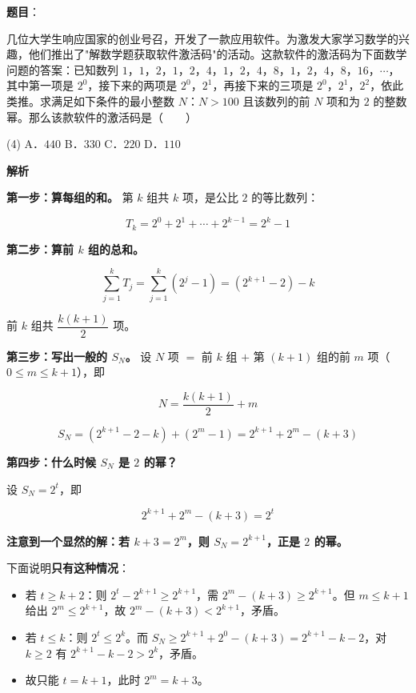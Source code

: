 \begin{answer}

\textbf{题目}：

几位大学生响应国家的创业号召，开发了一款应用软件。为激发大家学习数学的兴趣，他们推出了"解数学题获取软件激活码"的活动。这款软件的激活码为下面数学问题的答案：已知数列 $1$，$1$，$2$，$1$，$2$，$4$，$1$，$2$，$4$，$8$，$1$，$2$，$4$，$8$，$16$，$\cdots$，其中第一项是 $2^{0}$，接下来的两项是 $2^{0}$，$2^{1}$，再接下来的三项是 $2^{0}$，$2^{1}$，$2^{2}$，依此类推。求满足如下条件的最小整数 $N$：$N>100$ 且该数列的前 $N$ 项和为 $2$ 的整数幂。那么该款软件的激活码是\mbox{（　　）}

\begin{gkopts}(4)
\task A．$440$
\task B．$330$
\task C．$220$
\task D．$110$
\end{gkopts}

\textbf{解析}

\textbf{第一步：算每组的和。} 第 $k$ 组共 $k$ 项，是公比 $2$ 的等比数列：

\nopagebreak[4]
\[T_k=2^{0}+2^{1}+\cdots+2^{k-1}=2^{k}-1\]

\textbf{第二步：算前 $k$ 组的总和。}

\nopagebreak[4]
\[\sum_{j=1}^{k}T_j=\sum_{j=1}^{k}\left(2^{j}-1\right)=\left(2^{k+1}-2\right)-k\]

前 $k$ 组共 $\dfrac{k(k+1)}2$ 项。

\textbf{第三步：写出一般的 $S_N$。} 设 $N$ 项 $=$ 前 $k$ 组 $+$ 第 $(k+1)$ 组的前 $m$ 项（$0\le m\le k+1$），即

\nopagebreak[4]
\[N=\frac{k(k+1)}2+m\]

\nopagebreak[4]
\[S_N=\left(2^{k+1}-2-k\right)+\left(2^{m}-1\right)=2^{k+1}+2^{m}-(k+3)\]

\textbf{第四步：什么时候 $S_N$ 是 $2$ 的幂？}

设 $S_N=2^{t}$，即

\nopagebreak[4]
\[2^{k+1}+2^{m}-(k+3)=2^{t}\]

\textbf{注意到一个显然的解：若 $k+3=2^{m}$，则 $S_N=2^{k+1}$，正是 $2$ 的幂。}

下面说明\textbf{只有这种情况}：

\begin{itemize}
\item 若 $t\ge k+2$：则 $2^{t}-2^{k+1}\ge2^{k+1}$，需 $2^{m}-(k+3)\ge2^{k+1}$。但 $m\le k+1$ 给出 $2^{m}\le2^{k+1}$，故 $2^{m}-(k+3)<2^{k+1}$，矛盾。
\item 若 $t\le k$：则 $2^{t}\le2^{k}$。而 $S_N\ge2^{k+1}+2^{0}-(k+3)=2^{k+1}-k-2$，对 $k\ge2$ 有 $2^{k+1}-k-2>2^{k}$，矛盾。
\item 故只能 $t=k+1$，此时 $2^{m}=k+3$。
\end{itemize}


\end{answer}
